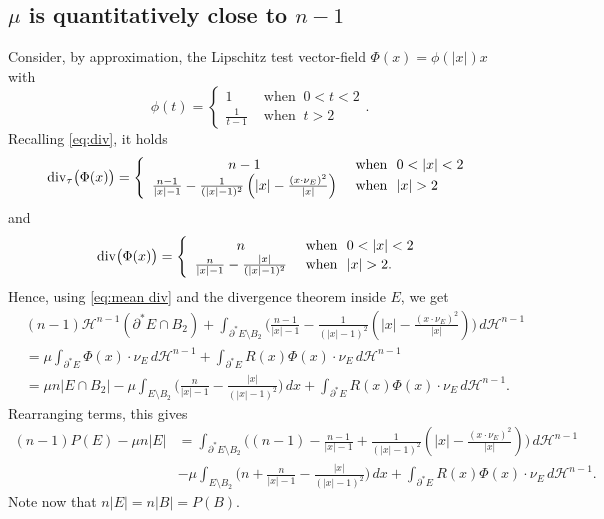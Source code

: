 \documentclass[reqno,11pt]{amsart}
\numberwithin{equation}{section}
\theoremstyle{remark}
\begin{document}
 

 


\subsection{$\mu$ is quantitatively close to $n-1$}
Consider, by approximation, the Lipschitz test vector-field $\Phi(x)=\phi(|x|)x$ with
$$\phi(t)=\left\{
\begin{array}{cl}
  1 & \text{ when } \ 0<t<2 \\
\frac{1}{t-1} &  \text{ when } \ t>2
\end{array}\right. .$$ 
Recalling \eqref{eq:div}, it holds
$$ {\rm div}_\tau \big(\Phi(x)\big)=\left\{
\begin{array}{cl}
  n-1 & \text{ when } \ 0<|x|<2 \\
  \frac{n-1}{|x|-1} - \frac{1}{(|x|-1)^2}\left(|x| -\frac{(x\cdot \nu_E)^2}{|x|}\right)&  \text{ when } \ |x|>2
\end{array}\right.$$
and
$$ {\rm div} \big(\Phi(x)\big)=\left\{
\begin{array}{cl}
  n & \text{ when } \ 0<|x|<2 \\
  \frac{n}{|x|-1} - \frac{|x|}{(|x|-1)^2}&  \text{ when } \ |x|>2.
\end{array}\right. $$
Hence, using \eqref{eq:mean div} and the divergence theorem inside $E$, we get
\begin{align*}
&(n-1)\mathscr H^{n-1}(\partial^*E\cap B_2)+ \int_{\partial^*E\setminus B_2} \bigg(\frac{n-1}{|x|-1} - \frac{1}{(|x|-1)^2}\left(|x| -\frac{(x\cdot \nu_E)^2}{|x|}\right)\bigg)\,d\mathscr H^{n-1}\\
&= \mu \int_{\partial^*E} \Phi(x)\cdot \nu_E\,d\mathscr H^{n-1} + \int_{\partial^*E} R(x)  \Phi(x)\cdot \nu_E \,d\mathscr H^{n-1}\\
&=\mu n |E\cap B_2| -\mu \int_{E\setminus B_2} \bigg(\frac{n}{|x|-1} - \frac{|x|}{(|x|-1)^2}\bigg)\,dx + \int_{\partial^*E} R(x)  \Phi(x)\cdot \nu_E \,d\mathscr H^{n-1}.
\end{align*}
Rearranging terms, this gives
\begin{align*}
(n-1)P(E)-\mu n|E|&=
 \int_{\partial^*E\setminus B_2} \bigg((n-1)-\frac{n-1}{|x|-1} + \frac{1}{(|x|-1)^2}\left(|x| -\frac{(x\cdot \nu_E)^2}{|x|}\right)\bigg)\,d\mathscr H^{n-1}\\
 &-\mu \int_{E\setminus B_2} \bigg(n+\frac{n}{|x|-1} - \frac{|x|}{(|x|-1)^2}\bigg)\,dx + \int_{\partial^*E} R(x)  \Phi(x)\cdot \nu_E \,d\mathscr H^{n-1}.
\end{align*}
Note now that $n|E|=n|B|=P(B)$.
\end{document}
